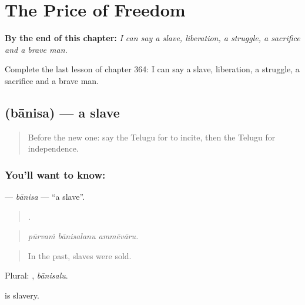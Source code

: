 
\chapter{The Price of Freedom}
\label{ch:te-the-price-of-freedom}

\begin{chapteropening}
\textbf{By the end of this chapter:} \emph{I can say a slave, liberation, a struggle, a sacrifice and a brave man.}

Complete the last lesson of chapter 364: I can say a slave, liberation, a struggle, a sacrifice and a brave man.
\end{chapteropening}

\section[\texorpdfstring{\te{బానిస} (bānisa)}{బానిస (bānisa)}]{ (bānisa) — a slave}

\label{lesson:TE-C364-banisa}



\begin{quote}
Before the new one: say the Telugu for to incite, then the Telugu for independence.
\end{quote}

\subsection*{You'll want to know: }
\textbf{} — \emph{bānisa} — \textquotedblleft{}a slave\textquotedblright{}.

\begin{quote}
  .
\end{quote}

\begin{quote}
\emph{pūrvaṁ bānisalanu ammēvāru.}
\end{quote}

\begin{quote}
In the past, slaves were sold.
\end{quote}

Plural: , \emph{bānisalu}.

 is slavery.

